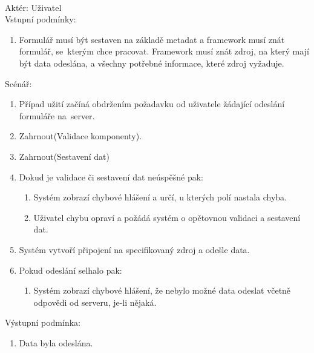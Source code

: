 \\
Aktér: Uživatel\\
Vstupní podmínky:
\begin{enumerate}
\item Formulář musí být sestaven na základě metadat a framework musí znát formulář, se~kterým chce pracovat. Framework musí znát zdroj, na který mají být data odeslána, a všechny potřebné informace, které zdroj vyžaduje.
\end{enumerate}
Scénář:
\begin{enumerate}
\item Případ užití začíná obdržením požadavku od uživatele žádající odeslání formuláře na~server.
\item Zahrnout(Validace komponenty).
\item Zahrnout(Sestavení dat)
\item Dokud je validace či sestavení dat neúspěšné pak:
\begin{enumerate}
\item Systém zobrazí chybové hlášení a určí, u kterých polí nastala chyba.
\item Uživatel chybu opraví a požádá systém o opětovnou validaci a sestavení dat.
\end{enumerate}
\item Systém vytvoří připojení na specifikovaný zdroj a odešle data.
\item Pokud odeslání selhalo pak:
\begin{enumerate}
\item Systém zobrazí chybové hlášení, že nebylo možné data odeslat včetně odpovědi od serveru, je-li nějaká.
\end{enumerate}
\end{enumerate}

Výstupní podmínka:
\begin{enumerate}
\item Data byla odeslána.
\end{enumerate}


